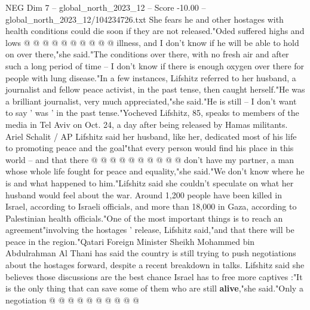 \begin{textsample}{NEG Dim 7 – global\_north\_2023\_12 – Score -10.00 – global\_north\_2023\_12/104234726.txt}
She fears he and other hostages with health conditions could die soon if they are not released."Oded suffered highs and lows @ @ @ @ @ @ @ @ @ @ illness, and I don't know if he will be able to hold on over there,"she said."The conditions over there, with no fresh air and after such a long period of time -- I don't know if there is enough oxygen over there for people with lung disease."In a few instances, Lifshitz referred to her husband, a journalist and fellow peace activist, in the past tense, then caught herself."He was a brilliant journalist, very much appreciated,"she said."He is still -- I don't want to say ' was ' in the past tense."Yocheved Lifshitz, 85, speaks to members of the media in Tel Aviv on Oct. 24, a day after being released by Hamas militants.
Ariel Schalit / AP Lifshitz said her husband, like her, dedicated most of his life to promoting peace and the goal"that every person would find his place in this world -- and that there @ @ @ @ @ @ @ @ @ @ don't have my partner, a man whose whole life fought for peace and equality,"she said."We don't know where he is and what happened to him."Lifshitz said she couldn't speculate on what her husband would feel about the war.
Around 1,200 people have been killed in Israel, according to Israeli officials, and more than 18,000 in Gaza, according to Palestinian health officials."One of the most important things is to reach an agreement"involving the hostages ' release, Lifshitz said,"and that there will be peace in the region."Qatari Foreign Minister Sheikh Mohammed bin Abdulrahman Al Thani has said the country is still trying to push negotiations about the hostages forward, despite a recent breakdown in talks.
Lifshitz said she believes those discussions are the best chance Israel has to free more captives :"It is the only thing that can save some of them who are still \textbf{alive},"she said."Only a negotiation @ @ @ @ @ @ @ @ @ @

\end{textsample}
